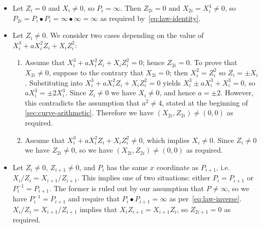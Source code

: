 \documentclass{article}
\begin{document}
\begin{itemize}
    \item Let $Z_i=0$ and $X_i \ne 0$, so $P_i = \infty$.
        Then $Z_{2i}=0$ and $X_{2i} = X_i^4 \ne 0$, so $P_{2i} = P_i \bullet P_i = \infty\bullet\infty = \infty$ as required by~\eqref{eq:law-identity}.
    \item Let $Z_i \ne 0$. We consider two cases depending on the value of $X_i^3 + aX_i^2 Z_i + X_i Z_i^2$:
        \begin{enumerate}
            \item Assume that $X_i^3 + aX_i^2 Z_i + X_i Z_i^2 = 0$; hence $Z_{2i} = 0$.
                To prove that $X_{2i} \ne 0$, suppose to the contrary that $X_{2i}=0$; then $X_i^2 = Z_i^2$ so $Z_i = \pm X_i$.
                Substituting into $X_i^3 + aX_i^2 Z_i + X_i Z_i^2 = 0$ yields $X_i^3 \pm aX_i^3 + X_i^3 = 0$, so $aX_i^3 = \pm 2X_i^3$.
                Since $Z_i \ne 0$ we have $X_i \ne 0$, and hence $a = \pm 2$.
                However, this contradicts the assumption that $a^2 \ne 4$, stated at the beginning of \autoref{sec:curve-arithmetic}.
                Therefore we have $(X_{2i}, Z_{2i}) \ne (0, 0)$ as required.
            \item Assume that $X_i^3 + aX_i^2 Z_i + X_i Z_i^2 \ne 0$, which implies $X_i \ne 0$.
                Since $Z_i \ne 0$ we have $Z_{2i} \ne 0$, so we have $(X_{2i}, Z_{2i}) \ne (0, 0)$ as required.
        \end{enumerate}
    \item Let $Z_i \ne 0$, $Z_{i+1} \ne 0$, and $P_i$ has the same $x$ coordinate as $P_{i+1}$, i.e.\ $X_i/Z_i = X_{i+1}/Z_{i+1}$.
        This implies one of two situations: either $P_i = P_{i+1}$ or $P_i^{-1} = P_{i+1}$.
        The former is ruled out by our assumption that $P \ne \infty$, so we have $P_i^{-1} = P_{i+1}$ and require that $P_i \bullet P_{i+1} = \infty$ as per~\eqref{eq:law-inverse}.
        $X_i/Z_i = X_{i+1}/Z_{i+1}$ implies that $X_i Z_{i+1} = X_{i+1} Z_{i}$, so $Z_{2i+1} = 0$ as required.


\end{itemize}
\end{document}
